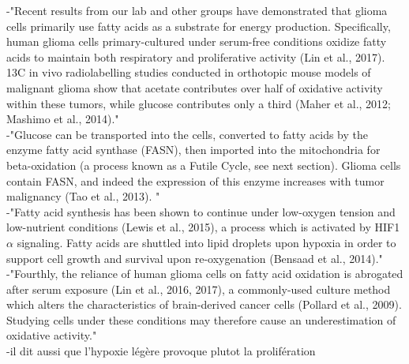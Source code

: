 \documentclass[11pt,a4paper]{article}
\begin{document}
-"Recent results from our lab and other groups have demonstrated that glioma cells primarily use fatty acids as a substrate for energy production. Specifically, human glioma cells primary-cultured under serum-free conditions oxidize fatty acids to maintain both respiratory and proliferative activity (Lin et al., 2017). 13C in vivo radiolabelling studies conducted in orthotopic mouse models of malignant glioma show that acetate contributes over half of oxidative activity within these tumors, while glucose contributes only a third (Maher et al., 2012; Mashimo et al., 2014)."\\

-"Glucose can be transported into the cells, converted to fatty acids by the enzyme fatty acid synthase (FASN), then imported into the mitochondria for beta-oxidation (a process known as a Futile Cycle, see next section). Glioma cells contain FASN, and indeed the expression of this enzyme increases with tumor malignancy (Tao et al., 2013). "\\

-"Fatty acid synthesis has been shown to continue under low-oxygen tension and low-nutrient conditions (Lewis et al., 2015), a process which is activated by HIF1$\alpha$ signaling. Fatty acids are shuttled into lipid droplets upon hypoxia in order to support cell growth and survival upon re-oxygenation (Bensaad et al., 2014)."\\

-"Fourthly, the reliance of human glioma cells on fatty acid oxidation is abrogated after serum exposure (Lin et al., 2016, 2017), a commonly-used culture method which alters the characteristics of brain-derived cancer cells (Pollard et al., 2009). Studying cells under these conditions may therefore cause an underestimation of oxidative activity."\\

-il dit aussi que l'hypoxie légère provoque plutot la prolifération
\end{document}

